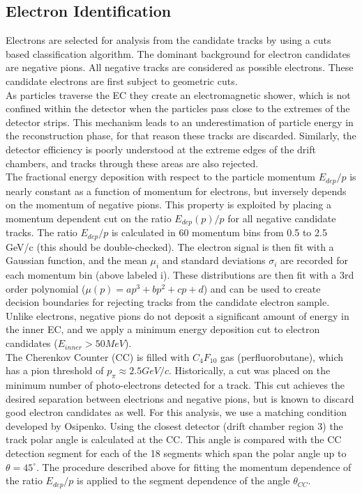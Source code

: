 \subsection{Electron Identification}
Electrons are selected for analysis from the candidate tracks by using a cuts based classification algorithm.  The dominant background for electron candidates are negative pions.  All negative tracks are considered as possible electrons.  These candidate electrons are first subject to geometric cuts.  
\\
As particles traverse the EC they create an electromagnetic shower, which is not confined within the detector when the particles pass close to the extremes of the detector strips.  This mechanism leads to an underestimation of particle energy in the reconstruction phase, for that reason these tracks are discarded.  Similarly, the detector efficiency is poorly understood at the extreme edges of the drift chambers, and tracks through these areas are also rejected.  
\\
The fractional energy deposition with respect to the particle momentum $E_{dep}/p$ is nearly constant as a function of momentum for electrons, but inversely depends on the momentum of negative pions.  This property is exploited by placing a momentum dependent cut on the ratio $E_{dep}(p)/p$ for all negative candidate tracks.  The ratio $E_{dep}/p$ is calculated in 60 momentum bins from 0.5 to 2.5 GeV/c (this should be double-checked).  The electron signal is then fit with a Gaussian function, and the mean $\mu_i$ and standard deviations $\sigma_i$ are recorded for each momentum bin (above labeled i).  These distributions are then fit with a 3rd order polynomial ($\mu(p) = ap^3 + bp^2 + cp + d$) and can be used to create decision boundaries for rejecting tracks from the candidate electron sample.  
\\
Unlike electrons, negative pions do not deposit a significant amount of energy in the inner EC, and we apply a minimum energy deposition cut to electron candidates ($E_{inner} > 50 MeV$).  
\\
The Cherenkov Counter (CC) is filled with $C_{4}F_{10}$ gas (perfluorobutane), which has a pion threshold of $p_{\pi} \approx 2.5 GeV/c$.  Historically, a cut was placed on the minimum number of photo-electrons detected for a track.  This cut achieves the desired separation between electrions and negative pions, but is known to discard good electron candidates as well.  For this analysis, we use a matching condition developed by Osipenko.  Using the closest detector (drift chamber region 3) the track polar angle is calculated at the CC.  This angle is compared with the CC detection segment for each of the 18 segments which span the polar angle up to $\theta = 45^{\circ}$.  The procedure described above for fitting the momentum dependence of the ratio $E_{dep}/p$ is applied to the segment dependence of the angle $\theta_{CC}$.  
\\
